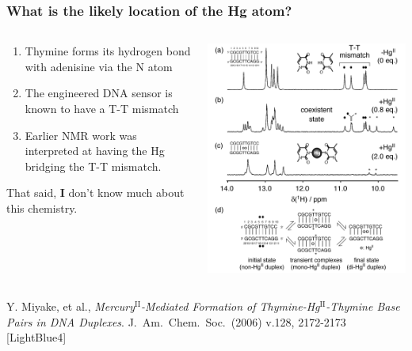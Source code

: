 \documentclass[10pt, xcolor=x11names, compress]{beamer}
\begin{document}
\begin{frame}
  \frametitle{What is the likely location of the Hg atom?}
  \begin{columns}
    \begin{column}{0.6\linewidth}
      \begin{enumerate}
      \item Thymine forms its hydrogen bond with adenisine via the N
        atom
      \item The engineered DNA sensor is known to have a T-T mismatch
      \item Earlier NMR work was interpreted at having the Hg bridging
        the T-T mismatch.
      \end{enumerate}

      \bigskip

      \begin{alertblock}{}
        That said, \textbf{I} don't know much about this chemistry.
      \end{alertblock}
    \end{column}
    \begin{column}{0.4\linewidth}
      \includegraphics[width=\linewidth]{images/nmr.png}      
    \end{column}
  \end{columns}

  \begin{bottomnote}[0.7][19]%
    Y. Miyake, et al.,
    \textit{Mercury$^{\mathrm{II}}$-Mediated Formation of
      Thymine-Hg$^{\mathrm{II}}$-Thymine Base Pairs in DNA
      Duplexes}.  J.~Am.~Chem.~Soc.~(2006) v.128, 2172-2173
    [LightBlue4]
  \end{bottomnote}
\end{frame}
\end{document}
